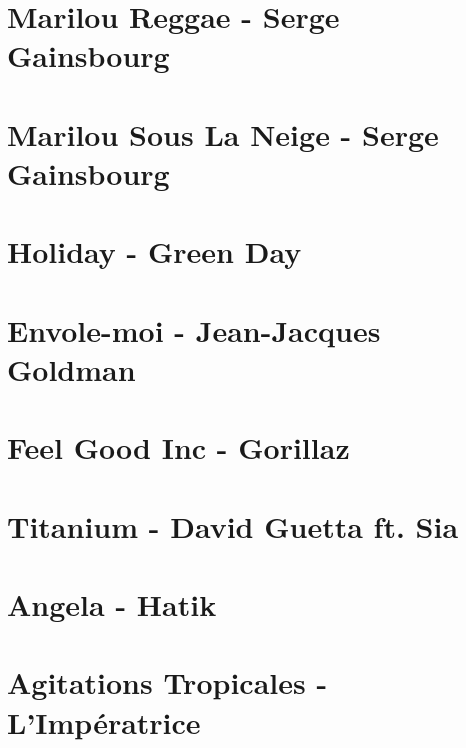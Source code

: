 \documentclass[11pt]{article}
\begin{document}
\section{Marilou Reggae - Serge Gainsbourg}
\begin{guitar}

\end{guitar}

\section{Marilou Sous La Neige - Serge Gainsbourg}
\begin{guitar}

\end{guitar}

\section*{Holiday - Green Day}

\section{Envole-moi - Jean-Jacques Goldman}


\section{Feel Good Inc - Gorillaz}


\section{Titanium - David Guetta ft. Sia}
\begin{guitar}

\end{guitar}

\section{Angela - Hatik}
\begin{guitar}

\end{guitar}



\section{Agitations Tropicales - L'Impératrice}

\end{document}
